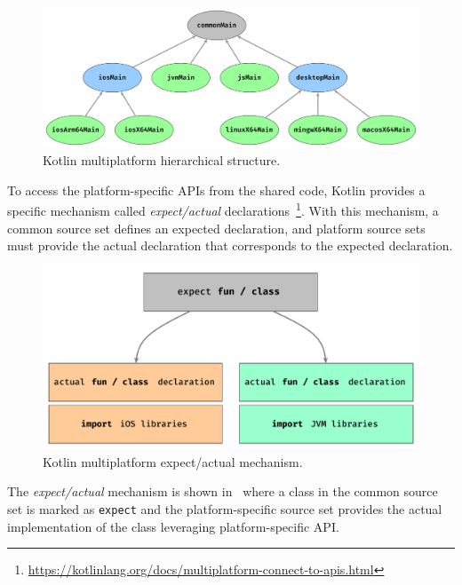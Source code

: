 

\begin{figure}[ht]
	\centering
	\includegraphics[width=\linewidth]{figures/kt-mp-package-structure.pdf}
	\caption{Kotlin multiplatform hierarchical structure.}
	\label{fig:kotlin-multiplatform-hierarchy}
\end{figure}

To access the platform-specific APIs from the shared code, Kotlin provides a specific mechanism called \emph{expect/actual}
declarations~\footnote{\url{https://kotlinlang.org/docs/multiplatform-connect-to-apis.html}}.
With this mechanism, a common source set defines an expected declaration, and platform source sets must provide the actual declaration that
corresponds to the expected declaration.

\begin{figure}[ht]
	\centering
	\includegraphics[width=0.95\linewidth]{figures/expect-actual-kotlin.pdf}
	\caption{Kotlin multiplatform expect/actual mechanism.}
	\label{fig:kotlin-multiplatform-expected-actual}
\end{figure}

The \emph{expect/actual} mechanism is shown in~ where a class in the common source set is marked as
\texttt{expect} and the platform-specific source set provides the actual implementation of the class leveraging platform-specific API.

